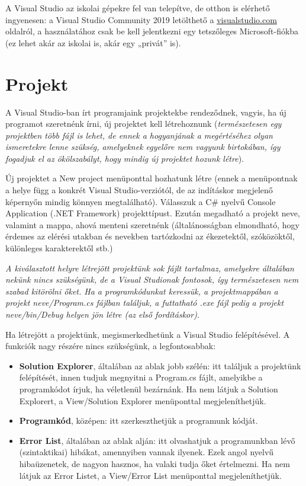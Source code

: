 \documentclass[a4paper]{article}
\begin{document}
	A Visual Studio az iskolai gépekre fel van telepítve, de otthon is elérhető ingyenesen: a Visual Studio Community 2019 letölthető a \href{https://visualstudio.microsoft.com/}{visualstudio.com} oldalról, a használatához csak be kell jelentkezni egy tetszőleges Microsoft-fiókba (ez lehet akár az iskolai is, akár egy „privát” is).
	
	\section{Projekt}
	A Visual Studio-ban írt programjaink projektekbe rendeződnek, vagyis, ha új programot szeretnénk írni, új projektet kell létrehoznunk (\emph{természetesen egy projektben több fájl is lehet, de ennek a hogyanjának a megértéséhez olyan ismeretekre lenne szükség, amelyeknek egyelőre nem vagyunk birtokában, így fogadjuk el az ökölszabályt, hogy mindig új projektet hozunk létre}).
	
	Új projektet a New project menüponttal hozhatunk létre (ennek a menüpontnak a helye függ a konkrét Visual Studio-verziótól, de az indításkor megjelenő képernyőn mindig könnyen megtalálható). Válasszuk a C\# nyelvű Console Application (.NET Framework) projekttípust. Ezután megadható a projekt neve, valamint a mappa, ahová menteni szeretnénk (általánosságban elmondható, hogy érdemes az elérési utakban és nevekben tartózkodni az ékezetektől, szóközöktől, különleges karakterektől stb.)
	
	\emph{A kiválasztott helyre létrejött projektünk sok fájlt tartalmaz, amelyekre általában nekünk nincs szükségünk, de a Visual Studionak fontosok, így természetesen nem szabad kitörölni őket. Ha a programkódunkat keressük, a projektmappában a projekt neve/Program.cs fájlban találjuk, a futtatható .exe fájl pedig a projekt neve/bin/Debug helyen jön létre (az első fordításkor).}
	
	Ha létrejött a projektünk, megismerkedhetünk a Visual Studio felépítésével. A funkciók nagy részére nincs szükségünk, a legfontosabbak:
	
	\begin{itemize}
		\item \textbf{Solution Explorer}, általában az ablak jobb szélén: itt találjuk a projektünk felépítését, innen tudjuk megnyitni a Program.cs fájlt, amelyikbe a programkódot írjuk, ha véletlenül bezárnánk. Ha nem látjuk a Solution Explorert, a View/Solution Explorer menüponttal megjeleníthetjük.
		\item \textbf{Programkód}, középen: itt szerkeszthetjük a programunk kódját.
		\item \textbf{Error List}, általában az ablak alján: itt olvashatjuk a programunkban lévő (szintaktikai) hibákat, amennyiben vannak ilyenek. Ezek angol nyelvű hibaüzenetek, de nagyon hasznos, ha valaki tudja őket értelmezni. Ha nem látjuk az Error Listet, a View/Error List menüponttal megjeleníthetjük.
	\end{itemize}
	
\end{document}
